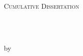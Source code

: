 \documentclass[
11pt, %
english, %
singlespacing, %
headsepline, %
onecolumn
]{MastersDoctoralThesis} %
\author{MyName \textsc{MyLastName}} %
\begin{document}

\frontmatter %

\pagestyle{plain} %


\begin{titlepage}
\begin{center}





\vspace*{2cm}
{\scshape\LARGE \univname\par}\vspace{1.5cm} %

\textsc{\Large Cumulative Dissertation}\\[0.4cm] %

\HRule \\[0.3cm] %
{\huge \bfseries {\ttitle}\par}\vspace{0.4cm} %
\HRule \\[0.3cm] %

\vspace*{1.5cm}

by\\
\vspace{0.8cm}
{\Large \textbf{\authorname}}


\end{center}
\end{titlepage}
\end{document}
